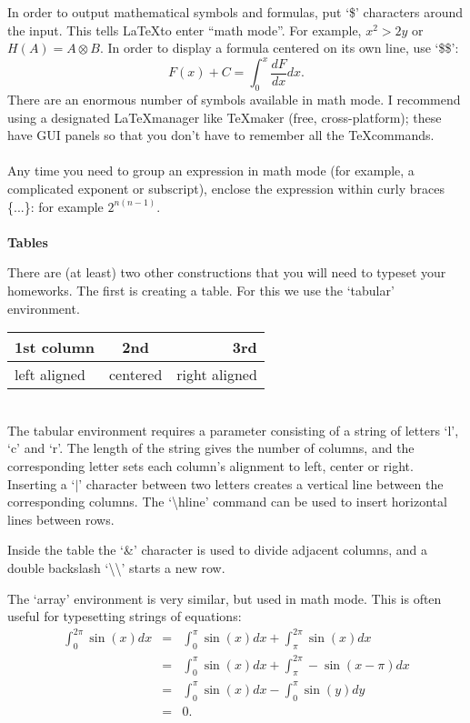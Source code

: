 \documentclass[letterpaper,10pt]{article}
\newcommand{\<}{\langle}
\renewcommand{\>}{\rangle}
\newcommand{\bsl}{\textbackslash}
\begin{document}
In order to output mathematical symbols and formulas, put `\$' characters around the input. This tells \LaTeX to enter ``math mode''. For example, $x^2>2y$ or $H(A)=A\otimes B$. In order to display a formula centered on its own line, use `\$\$':
$$F(x)+C=\int_0^x \frac{dF}{dx} dx.$$
There are an enormous number of symbols available in math mode. I recommend using a designated \LaTeX manager like \TeX maker (free, cross-platform); these have GUI panels so that you don't have to remember all the \TeX commands.\\\\

Any time you need to group an expression in math mode (for example, a complicated exponent or subscript), enclose the expression within curly braces \{...\}: for example $2^{n(n-1)}$.
\\\\

\Large \textbf{Tables} \normalsize

There are (at least) two other constructions that you will need to typeset your homeworks. The first is creating a table. For this we use the `tabular' environment.\\

\begin{tabular}{l|cr|}
1st column& 2nd & 3rd \\
\hline
left aligned& centered& right aligned\\
\hline
\end{tabular}\\

The tabular environment requires a parameter consisting of a string of letters `l', `c' and `r'. The length of the string gives the number of columns, and the corresponding letter sets each column's alignment to left, center or right. Inserting a `$\mid$' character between two letters creates a vertical line between the corresponding columns. The `\bsl hline' command can be used to insert horizontal lines between rows.

Inside the table the `\&' character is used to divide adjacent columns, and a double backslash `\bsl\bsl' starts a new row.

The `array' environment is very similar, but used in math mode. This is often useful for typesetting strings of equations:
$$\begin{array}{rcl}
\int_0^{2\pi} \sin(x) dx &=& \int_0^{\pi} \sin(x) dx + \int_\pi^{2\pi} \sin(x) dx \\
&=& \int_0^{\pi} \sin(x) dx + \int_\pi^{2\pi} -\sin(x-\pi) dx\\
&=& \int_0^{\pi} \sin(x) dx - \int_0^{\pi} \sin(y) dy\\
&=&0.\\
\end{array}$$
\end{document}
